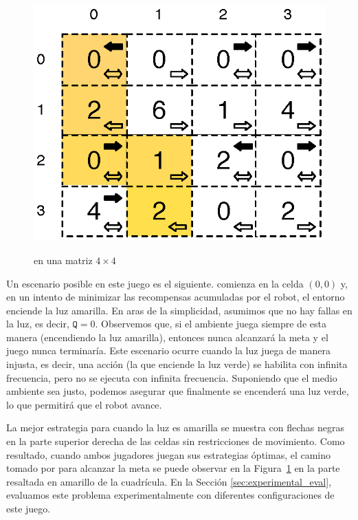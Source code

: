 \begin{figure}
\centering
{\fontsize{6.6}{6.6}\selectfont\ttfamily
\includegraphics[scale=0.65]{Figs/robotMovesRewards.eps}\hspace{1em}\mbox{}}
\caption{\roborta en una matriz $4 \times 4$} \label{fig:robot_game_grid}
\end{figure}

Un escenario posible en este juego es el siguiente. \roborta comienza en la celda $(0,0)$ y, en un intento de minimizar las recompensas acumuladas por el robot, el entorno enciende la luz amarilla.
En aras de la simplicidad, asumimos que no hay fallas en la luz, es decir, $\texttt{Q}=0$.
Observemos que, si el ambiente juega siempre de esta manera (encendiendo la luz amarilla), entonces \roborta nunca alcanzará la meta y
el juego nunca terminaría. Este escenario ocurre cuando la luz juega de manera injusta, es decir, una acción (la que enciende la luz verde) se habilita con infinita frecuencia, pero no se ejecuta con infinita frecuencia.
Suponiendo que el medio ambiente sea justo, podemos asegurar que finalmente se encenderá una luz verde, lo que permitirá que el robot avance.

La mejor estrategia para \roborta cuando la luz es amarilla se muestra con flechas negras en la parte superior derecha de las celdas sin restricciones de movimiento.
Como resultado, cuando ambos jugadores juegan sus estrategias óptimas, el camino tomado por \roborta para alcanzar la meta se puede observar en la Figura~\ref{fig:robot_game_grid} en la parte resaltada en amarillo de la cuadrícula. En la Sección \ref{sec:experimental_eval}, evaluamos este problema experimentalmente con diferentes
configuraciones de este juego.




